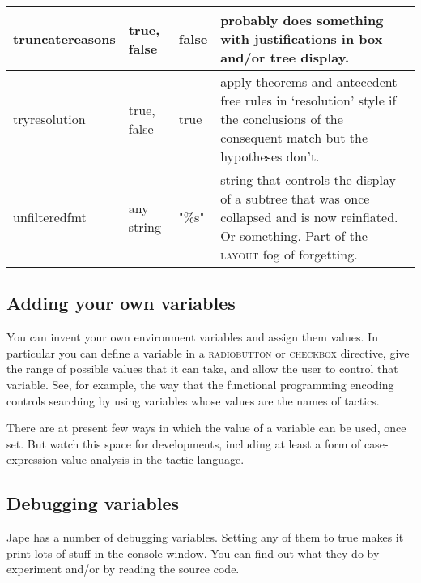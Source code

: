 \begin{longtable}{|l|p{2cm}|l|p{2.5in}|}
truncatereasons & true, false & false & probably does something with justifications in box and/or tree display.\\ \hline

{\raggedright tryresolution} & {\raggedright true, false} & {\raggedright true} & {\raggedright apply theorems and antecedent-free rules in `resolution' style if the conclusions of the consequent match but the hypotheses don't.}\\
\hline
{\raggedright unfilteredfmt} & {\raggedright any string} & {\raggedright "\%s"} & {\raggedright string that controls the display of a subtree that was once collapsed and is now reinflated. Or something. Part of the \textsc{layout} fog of forgetting.}\\
\hline
\end{longtable}


\subsection{Adding your own variables}


You can invent your own environment variables and assign them values. In particular you can define a variable in a \textsc{radiobutton} or \textsc{checkbox} directive, give the range of possible values that it can take, and allow the user to control that variable. See, for example, the way that the functional programming encoding controls searching by using variables whose values are the names of tactics.


There are at present few ways in which the value of a variable can be used, once set. But watch this space for developments, including at least a form of case-expression value analysis in the tactic language.


\subsection{Debugging variables}


Jape has a number of debugging variables. Setting any of them to true makes it print lots of stuff in the console window. You can find out what they do by experiment and/or by reading the source code.

 